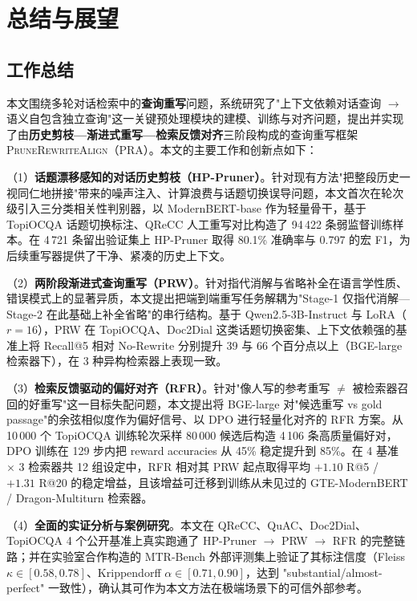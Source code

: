 \chapter{总结与展望}
\label{chap:conclusion}

\section{工作总结}

本文围绕多轮对话检索中的\textbf{查询重写}问题，系统研究了"上下文依赖对话查询 $\rightarrow$ 语义自包含独立查询"这一关键预处理模块的建模、训练与对齐问题，提出并实现了由\textbf{历史剪枝—渐进式重写—检索反馈对齐}三阶段构成的查询重写框架 \textsc{PruneRewriteAlign}（PRA）。本文的主要工作和创新点如下：

（1）\textbf{话题漂移感知的对话历史剪枝（HP-Pruner）}。针对现有方法"把整段历史一视同仁地拼接"带来的噪声注入、计算浪费与话题切换误导问题，本文首次在轮次级引入三分类相关性判别器，以 ModernBERT-base 作为轻量骨干，基于 TopiOCQA 话题切换标注、QReCC 人工重写对比构造了 94\,422 条弱监督训练样本。在 4\,721 条留出验证集上 HP-Pruner 取得 80.1\% 准确率与 0.797 的宏 F1，为后续重写器提供了干净、紧凑的历史上下文。

（2）\textbf{两阶段渐进式查询重写（PRW）}。针对指代消解与省略补全在语言学性质、错误模式上的显著异质，本文提出把端到端重写任务解耦为"Stage-1 仅指代消解—Stage-2 在此基础上补全省略"的串行结构。基于 Qwen2.5-3B-Instruct 与 LoRA（$r{=}16$），PRW 在 TopiOCQA、Doc2Dial 这类话题切换密集、上下文依赖强的基准上将 Recall@5 相对 No-Rewrite 分别提升 39 与 66 个百分点以上（BGE-large 检索器下），在 3 种异构检索器上表现一致。

（3）\textbf{检索反馈驱动的偏好对齐（RFR）}。针对"像人写的参考重写 $\ne$ 被检索器召回的好重写"这一目标失配问题，本文提出将 BGE-large 对"候选重写 vs gold passage"的余弦相似度作为偏好信号、以 DPO 进行轻量化对齐的 RFR 方案。从 10\,000 个 TopiOCQA 训练轮次采样 80\,000 候选后构造 4\,106 条高质量偏好对，DPO 训练在 129 步内把 reward accuracies 从 45\% 稳定提升到 85\%。在 4 基准 $\times$ 3 检索器共 12 组设定中，RFR 相对其 PRW 起点取得平均 $+1.10$ R@5 / $+1.31$ R@20 的稳定增益，且该增益可迁移到训练从未见过的 GTE-ModernBERT / Dragon-Multiturn 检索器。

（4）\textbf{全面的实证分析与案例研究}。本文在 QReCC、QuAC、Doc2Dial、TopiOCQA 4 个公开基准上真实跑通了 HP-Pruner $\to$ PRW $\to$ RFR 的完整链路；并在实验室合作构造的 MTR-Bench 外部评测集上验证了其标注信度（Fleiss $\kappa\in[0.58, 0.78]$、Krippendorff $\alpha\in[0.71, 0.90]$，达到 "substantial/almost-perfect" 一致性），确认其可作为本文方法在极端场景下的可信外部参考。

